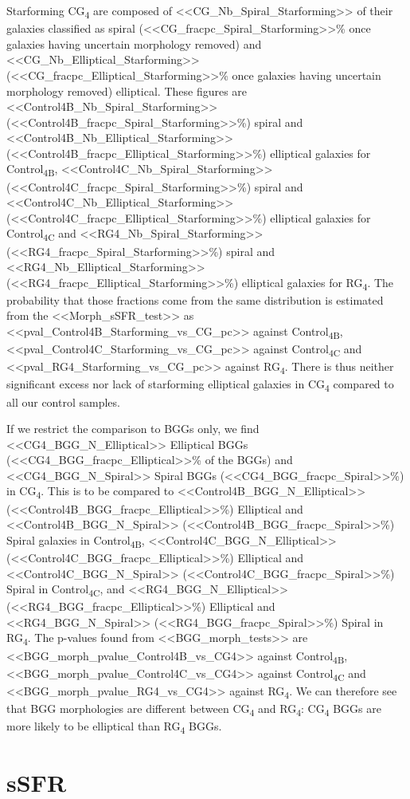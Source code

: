 \documentclass{aa}
\newcommand{\CB}{Control\textsubscript{4B}}
\newcommand{\CC}{Control\textsubscript{4C}}
\newcommand{\CG}{CG\textsubscript{4}}
\newcommand{\RG}{RG\textsubscript{4}}
\begin{document}
Starforming \CG{} are composed of <<CG_Nb_Spiral_Starforming>> of their galaxies classified as spiral 
(<<CG_fracpc_Spiral_Starforming>>\% once galaxies having uncertain morphology removed) and 
<<CG_Nb_Elliptical_Starforming>> (<<CG_fracpc_Elliptical_Starforming>>\% once galaxies having uncertain morphology removed) elliptical.
These figures are <<Control4B_Nb_Spiral_Starforming>> (<<Control4B_fracpc_Spiral_Starforming>>\%) spiral
and <<Control4B_Nb_Elliptical_Starforming>> (<<Control4B_fracpc_Elliptical_Starforming>>\%) elliptical galaxies for \CB{}, 
<<Control4C_Nb_Spiral_Starforming>> (<<Control4C_fracpc_Spiral_Starforming>>\%) spiral
and <<Control4C_Nb_Elliptical_Starforming>> (<<Control4C_fracpc_Elliptical_Starforming>>\%) elliptical galaxies for \CC{}
and <<RG4_Nb_Spiral_Starforming>> (<<RG4_fracpc_Spiral_Starforming>>\%) spiral
and <<RG4_Nb_Elliptical_Starforming>> (<<RG4_fracpc_Elliptical_Starforming>>\%) elliptical galaxies for \RG{}. 
The probability that those fractions come from 
the same distribution is estimated from the <<Morph_sSFR_test>> as <<pval_Control4B_Starforming_vs_CG_pc>> against \CB,
<<pval_Control4C_Starforming_vs_CG_pc>> against \CC{} and <<pval_RG4_Starforming_vs_CG_pc>> against \RG. There is thus 
neither significant excess nor lack of 
starforming elliptical galaxies in \CG{} compared to all our control samples.

If we restrict the comparison to BGGs only, we find <<CG4_BGG_N_Elliptical>> Elliptical BGGs (<<CG4_BGG_fracpc_Elliptical>>\% of the BGGs) and
<<CG4_BGG_N_Spiral>> Spiral BGGs (<<CG4_BGG_fracpc_Spiral>>\%) 
 in \CG{}.
  This is to be compared to 
 <<Control4B_BGG_N_Elliptical>> (<<Control4B_BGG_fracpc_Elliptical>>\%) Elliptical and
 <<Control4B_BGG_N_Spiral>> (<<Control4B_BGG_fracpc_Spiral>>\%) Spiral galaxies in \CB{}, 
 <<Control4C_BGG_N_Elliptical>> (<<Control4C_BGG_fracpc_Elliptical>>\%) Elliptical and
 <<Control4C_BGG_N_Spiral>> (<<Control4C_BGG_fracpc_Spiral>>\%)  Spiral in \CC{},
  and  <<RG4_BGG_N_Elliptical>> (<<RG4_BGG_fracpc_Elliptical>>\%) Elliptical and
  <<RG4_BGG_N_Spiral>> (<<RG4_BGG_fracpc_Spiral>>\%) Spiral
  in \RG{}. 
The p-values found from <<BGG_morph_tests>> are 
  <<BGG_morph_pvalue_Control4B_vs_CG4>> against \CB,
  <<BGG_morph_pvalue_Control4C_vs_CG4>> against \CC{} and 
  <<BGG_morph_pvalue_RG4_vs_CG4>>  against \RG. 
We can therefore see that BGG morphologies are different between \CG{} and \RG{}: \CG{} BGGs are more likely 
to be elliptical than \RG{} BGGs.  

\section{sSFR}
\end{document}
